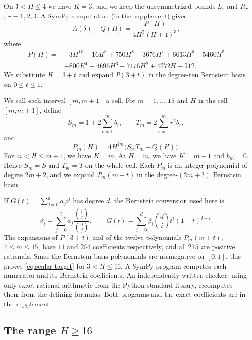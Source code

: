 \documentclass[ECP,preprint]{ejpecp}
\begin{document}
On $3<H\leq4$ we have $K=3$, and we keep the unsymmetrized bounds $L_r$ and
$R_r$, $r=1,2,3$. A SymPy computation (in the supplement) gives
\begin{equation}\label{eq:asymmetric-P}
  A(\delta)-Q(H)=\frac{P(H)}{4H^5(H+1)^3},
\end{equation}
where
\begin{align*}
  P(H)={}&-3H^{10}-16H^9+750H^8-3676H^7+6613H^6
  -5460H^5\\
  &+800H^4+4696H^3-7176H^2+4272H-912.
\end{align*}
We substitute $H=3+t$ and expand $P(3+t)$ in the degree-ten Bernstein basis
on $0\leq t\leq1$.

We call each interval $[m,m+1]$ a cell. For $m=4,\ldots,15$ and $H$ in the
cell $[m,m+1]$, define
\begin{equation}\label{eq:compact-ST}
  S_m=1+2\sum_{r=1}^m b_r,
  \qquad
  T_m=2\sum_{r=1}^m r^2b_r,
\end{equation}
and
\begin{equation}\label{eq:compact-P}
  P_m(H)=4H^{2m}\bigl(S_mT_m-Q(H)\bigr).
\end{equation}
For $m<H\leq m+1$, we have $K=m$. At $H=m$, we have $K=m-1$ and $b_m=0$.
Hence $S_m=S$ and $T_m=T$ on the whole cell. Each $P_m$ is an integer
polynomial of degree $2m+2$, and we expand $P_m(m+t)$ in the
degree-$(2m+2)$ Bernstein basis.

If $G(t)=\sum_{j=0}^d a_jt^j$ has degree $d$, the Bernstein conversion used
here is
\begin{equation}\label{eq:bernstein-conversion}
  \beta_i=\sum_{j=0}^i a_j
  \frac{\binom{i}{j}}{\binom{d}{j}},
  \qquad
  G(t)=\sum_{i=0}^d \beta_i\binom di t^i(1-t)^{d-i}.
\end{equation}
The expansions of $P(3+t)$ and of the twelve polynomials $P_m(m+t)$,
$4\leq m\leq15$, have $11$ and $264$ coefficients respectively, and all
$275$ are positive rationals. Since the Bernstein basis polynomials are
nonnegative on $[0,1]$, this proves \eqref{eq:scalar-target} for
$3<H\leq16$. A SymPy program computes each numerator and its Bernstein
coefficients. An independently written checker, using only exact rational
arithmetic from the Python standard library, recomputes them from the
defining formulas. Both programs and the
exact coefficients are in the supplement.

\subsection{The range \texorpdfstring{$H\geq16$}{H >= 16}}
\label{sec:large}
\end{document}
